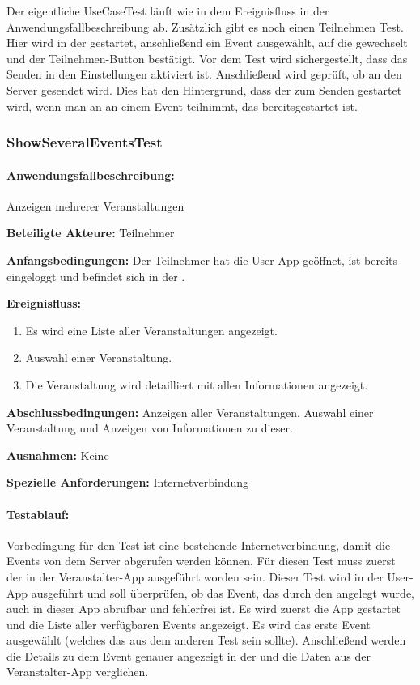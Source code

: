 Der eigentliche UseCaseTest läuft wie in dem Ereignisfluss in der Anwendungsfallbeschreibung ab. Zusätzlich gibt es noch einen Teilnehmen  Test. Hier wird in der  gestartet, anschließend ein Event ausgewählt, auf die  gewechselt und der Teilnehmen-Button bestätigt. Vor dem Test wird sichergestellt, dass das Senden in den Einstellungen aktiviert ist. Anschließend wird geprüft, ob an den Server gesendet wird. Dies hat den Hintergrund, dass der  zum Senden gestartet wird, wenn man an an einem Event teilnimmt, das bereitsgestartet ist.


\subsubsection{ShowSeveralEventsTest}
\paragraph{Anwendungsfallbeschreibung:} Anzeigen mehrerer Veranstaltungen

\textbf{Beteiligte Akteure:}
	Teilnehmer
	
\textbf{Anfangsbedingungen:}
	Der Teilnehmer hat die User-App geöffnet, ist bereits eingeloggt und befindet sich in der .
	
\textbf{Ereignisfluss:}
	\begin{enumerate}
		\item Es wird eine Liste aller Veranstaltungen angezeigt.
		\item Auswahl einer Veranstaltung.
		\item Die Veranstaltung wird detailliert mit allen Informationen angezeigt.
	\end{enumerate}
	
\textbf{Abschlussbedingungen:}
	Anzeigen aller Veranstaltungen. Auswahl einer Veranstaltung und Anzeigen von Informationen zu dieser.
	
\textbf{Ausnahmen:}
	Keine
	
\textbf{Spezielle Anforderungen:}
	Internetverbindung

\paragraph{Testablauf:}
Vorbedingung für den Test ist eine bestehende Internetverbindung, damit die Events von dem Server abgerufen werden können.
Für diesen Test muss zuerst der  in der Veranstalter-App ausgeführt worden sein. Dieser Test wird in der User-App ausgeführt und soll überprüfen, ob das Event, das durch den  angelegt wurde, auch in dieser App abrufbar und fehlerfrei ist.
Es wird zuerst die App gestartet und die Liste aller verfügbaren Events angezeigt. Es wird das erste Event ausgewählt (welches das aus dem anderen Test sein sollte). Anschließend werden die Details zu dem Event genauer angezeigt in der  und die Daten aus der Veranstalter-App verglichen.